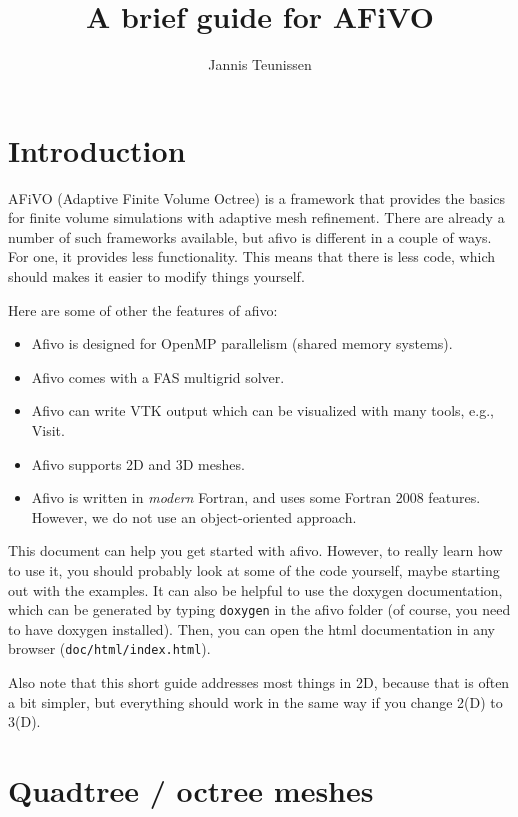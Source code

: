 \documentclass[a4paper, a4wide]{article}
\begin{document}
\lstset{language=bash}
\lstset{basicstyle=\ttfamily, columns=fixed, breaklines=true}

\title{A brief guide for AFiVO}
\author{Jannis Teunissen}
\maketitle

\section{Introduction}
\label{sec:introduction}

AFiVO (Adaptive Finite Volume Octree) is a framework that provides the basics
for finite volume simulations with adaptive mesh refinement.
There are already a number of such frameworks available, but afivo is different
in a couple of ways.
For one, it provides less functionality.
This means that there is less code, which should makes it easier to modify
things yourself.

Here are some of other the features of afivo:

\begin{itemize}
  \item Afivo is designed for OpenMP parallelism (shared memory systems).
  \item Afivo comes with a FAS multigrid solver.
  \item Afivo can write VTK output which can be visualized with many tools,
  e.g., Visit.
  \item Afivo supports 2D and 3D meshes.
  \item Afivo is written in \emph{modern} Fortran, and uses some Fortran 2008
  features.
  However, we do not use an object-oriented approach.
\end{itemize}

This document can help you get started with afivo. However, to really learn how
to use it, you should probably look at some of the code yourself, maybe starting
out with the examples. It can also be helpful to use the doxygen documentation,
which can be generated by typing \texttt{doxygen} in the afivo folder (of course,
you need to have doxygen installed). Then, you can open the html documentation
in any browser (\texttt{doc/html/index.html}).

Also note that this short guide addresses most things in 2D, because that is
often a bit simpler, but everything should work in the same way if you change
2(D) to 3(D).

\section{Quadtree / octree meshes}
\label{sec:amrmesh}
\end{document}
